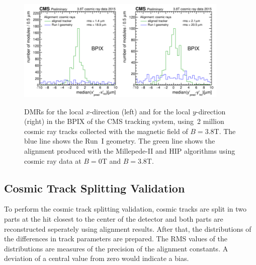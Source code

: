 \begin{figure}[htb]
    \begin{center}
        \includegraphics[width=0.45\textwidth]{../figs/Alignment/AlRes_CRAFT_DmedianR_BPIX_plain.png}\includegraphics[width=0.45\textwidth]{../figs/Alignment/AlRes_CRAFT_DmedianYR_BPIX_plain.png}
    \end{center}
    \caption {DMRs for the local $x$-direction (left) and for the local $y$-direction (right) in the BPIX of the CMS tracking system, using~2 million cosmic ray tracks collected with the magnetic field of $B=3.8$T. The blue line shows the Run~I geometry. The green line shows the alignment produced with the Millepede-II and HIP algorithms using cosmic ray data at $B=0$T and $B=3.8$T.}
    \label{fig:DMRs}
\end{figure}

\subsection{Cosmic Track Splitting Validation}
\label{sec:AlRes_trackSplit}

To perform the cosmic track splitting validation, cosmic tracks are split in two parts at the hit closest to the center of the detector and both parts are reconstructed seperately using alignment results. After that, the distributions of the differences in track parameters are prepared. The RMS values of the distributions are measures of the precision of the alignment constants. A deviation of a central value from zero would indicate a bias.

